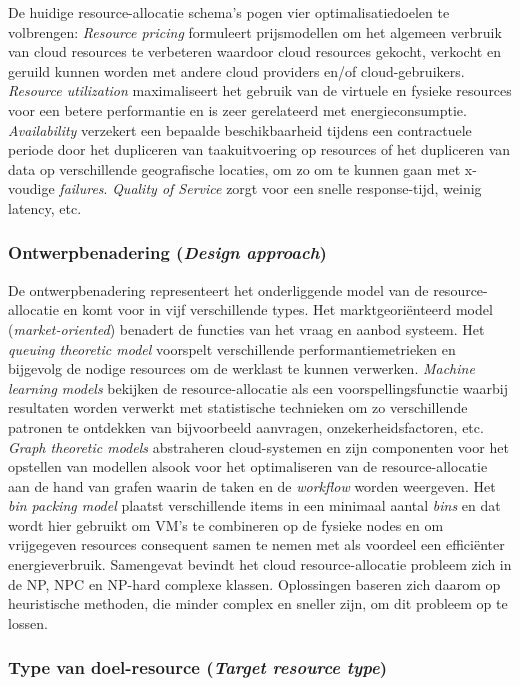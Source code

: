 De huidige resource-allocatie schema's pogen vier optimalisatiedoelen te volbrengen: \textit{Resource pricing} formuleert prijsmodellen om het algemeen verbruik van cloud resources te verbeteren waardoor cloud resources  gekocht, verkocht en geruild kunnen worden met andere cloud providers en/of cloud-gebruikers. \textit{Resource utilization} maximaliseert het gebruik van de virtuele en fysieke resources voor een betere performantie en is zeer gerelateerd met energieconsumptie. \textit{Availability} verzekert een bepaalde beschikbaarheid tijdens een contractuele periode door het dupliceren van taakuitvoering op resources of het dupliceren van data op verschillende geografische locaties, om zo om te kunnen gaan met x-voudige \textit{failures}. \textit{Quality of Service} zorgt voor een snelle response-tijd, weinig latency, etc.

\subsubsection{Ontwerpbenadering (\textit{Design approach})}

De ontwerpbenadering representeert het onderliggende model van de resource-allocatie en komt voor in vijf verschillende types. Het marktgeoriënteerd model (\textit{market-oriented}) benadert de functies van het vraag en aanbod systeem. Het \textit{queuing theoretic model} voorspelt verschillende performantiemetrieken en bijgevolg de nodige resources om de werklast te kunnen verwerken. \textit{Machine learning models} bekijken de resource-allocatie als een voorspellingsfunctie waarbij resultaten worden verwerkt met statistische technieken om zo verschillende patronen te ontdekken van bijvoorbeeld aanvragen, onzekerheidsfactoren, etc. \textit{Graph theoretic models} abstraheren cloud-systemen en zijn componenten voor het opstellen van modellen alsook voor het optimaliseren van de resource-allocatie aan de hand van grafen waarin de taken en de \textit{workflow} worden weergeven. Het \textit{bin packing model} plaatst verschillende items in een minimaal aantal \textit{bins} en dat wordt hier gebruikt om VM's te combineren op de fysieke nodes en om vrijgegeven resources consequent samen te nemen met als voordeel een efficiënter energieverbruik.
Samengevat bevindt het cloud resource-allocatie probleem zich in de NP, NPC en NP-hard complexe klassen. Oplossingen baseren zich daarom op heuristische methoden, die minder complex en sneller zijn, om dit probleem op te lossen.

\subsubsection{Type van doel-resource (\textit{Target resource type})}

